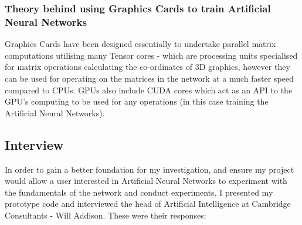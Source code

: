 \documentclass[./project-report/src/latex/project-report.tex]{subfiles}
\begin{document}
\subsubsection{Theory behind using Graphics Cards to train Artificial Neural Networks}
\vspace{5mm}

Graphics Cards have been designed essentially to undertake parallel matrix computations utilising many Tensor cores - which are processing units specialised for matrix operations 
calculating the co-ordinates of 3D graphics, however they can be used for operating on the matrices in the network at a much faster speed compared to CPUs. GPUs also include CUDA 
cores which act as an API to the GPU's computing to be used for any operations (in this case training the Artificial Neural Networks).

\subsection{Interview}
\label{sec:interview}

In order to gain a better foundation for my investigation, and ensure my project would allow a user interested in Artificial Neural Networks to experiment with the 
fundamentals of the network and conduct experiments, I presented my prototype code and interviewed the head of Artificial Intelligence at Cambridge Consultants - Will Addison. 
These were their responses:
\end{document}

